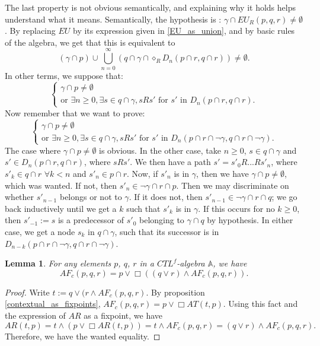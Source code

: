 \documentclass[11pt]{article}
\newcommand{\A}{{\mathbb A}}
\newtheorem{lemma}[definition]{Lemma}
\begin{document}
The last property is not obvious semantically, and explaining why it holds helps understand what it means. Semantically, the hypothesis is : $\gamma\cap EU_R(p,q,r)\not=\emptyset$. By replacing $EU$ by its expression given in \ref{EU_as_union}, and by basic rules of the algebra, we get that this is equivalent to \[(\gamma\cap p)\cup \bigcup_{n=0}^\infty(q\cap\gamma\cap\diamond_RD_n(p\cap r,q\cap r))\not=\emptyset.\] In other terms, we suppose that:
\begin{equation*}
    \begin{cases}
        \gamma\cap p \not=\emptyset \\
        \mbox{or }\exists n\geq 0,\exists s\in q\cap\gamma, sRs' \mbox{ for } s' \mbox{ in }D_n(p\cap r,q\cap r).
    \end{cases}
\end{equation*}
Now remember that we want to prove:
\begin{equation*}
    \begin{cases}
        \gamma\cap p \not=\emptyset \\
        \mbox{or }\exists n\geq 0,\exists s\in q\cap\gamma, sRs' \mbox{ for } s' \mbox{ in }D_n(p\cap r\cap\neg\gamma,q\cap r\cap\neg\gamma).
    \end{cases}
\end{equation*}
The case where $\gamma\cap p \not=\emptyset$ is obvious. In the other case, take $n\geq 0$, $s\in q\cap\gamma$ and $s'\in D_n(p\cap r,q\cap r)$, where $sRs'$. We then have a path $s'=s'_0R...Rs'_n$, where $s'_k\in q\cap r$ $\forall k<n$ and $s'_n\in p\cap r$. Now, if $s'_n$ is in $\gamma$, then we have $\gamma\cap p \not= \emptyset$, which was wanted. If not, then $s'_n\in \neg\gamma \cap r\cap p$. Then we may discriminate on whether $s'_{n-1}$ belongs or not to $\gamma$. If it does not, then $s'_{n-1}\in \neg\gamma\cap r\cap q$; we go back inductively until we get a $k$ such that $s'_k$ is in $\gamma$. If this occurs for no $k\geq 0$, then $s'_{-1}:=s$ is a predecessor of $s'_0$ belonging to $\gamma\cap q$ by hypothesis. In either case, we get a node $s_k$ in $q\cap\gamma$, such that its successor is in $D_{n-k}(p\cap r\cap\neg\gamma,q\cap r \cap\neg\gamma)$.
\begin{lemma}\label{another_fix_AFc}
    For any elements $p$, $q$, $r$ in a $CTL^f$-algebra $\A$, we have \[AF_c(p,q,r)=p\vee\Box((q\vee r)\wedge AF_c(p,q,r)).\]
\end{lemma}
\begin{proof}
    Write $t:=q\vee(r\wedge AF_c(p,q,r)$. By proposition \ref{contextual_as_fixpoints}, $AF_c(p,q,r)=p\vee\Box AT(t,p)$. Using this fact and the expression of $AR$ as a fixpoint, we have \[AR(t,p)=t\wedge(p\vee\Box AR(t,p))=t\wedge AF_c(p,q,r)=(q\vee r)\wedge AF_c(p,q,r).\] Therefore, we have the wanted equality.
\end{proof}
\end{document}
